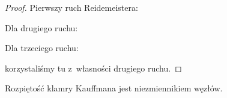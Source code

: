 \begin{proof}
Pierwszy ruch Reidemeistera:
\begin{comment}
\begin{align}
    \bracket{\MediumReidemeisterOneLeft} & \stackrel{K2}{=} A
    \bracket{\MediumReidemeisterOneSmoothA} +
    A^{-1} \bracket{\MediumReidemeisterOneSmoothB} \\ & \stackrel{K3}{=}
    A \bracket{\MediumReidemeisterOneStraight} +
    A^{-1}(-A^{-2}-A^2) \bracket{\MediumReidemeisterOneStraight} =
    -A^{-3}\bracket{\MediumReidemeisterOneStraight}
\end{align}
\end{comment}

Dla drugiego ruchu:
\begin{comment}
\begin{align}
    \bracket{\MediumKauffmanReidemeisterTwoA} & \stackrel{K2}{=}
    A \bracket{\MediumKauffmanReidemeisterTwoB} +
    A^{-1} \bracket{\MediumKauffmanReidemeisterTwoC} \\ & \stackrel{K1}{=}
    -A^{-2} \bracket{\MediumBetaSmoothing} +
    A^{-1} \bracket{\MediumKauffmanReidemeisterTwoC} \\ & \stackrel{K2}{=}
    -A^{-2} \bracket{\MediumBetaSmoothing} +
    A^{-1}A \bracket{\MediumAlphaSmoothing} +
    A^{-1}A^{-1} \bracket{\MediumBetaSmoothing} \\ & =
    \bracket{\MediumAlphaSmoothing}
\end{align}
\end{comment}

Dla trzeciego ruchu:
\begin{comment}
\begin{align}
\bracket{\MediumKauffmanReidemeisterThreeA} & \stackrel{K2}{=}
A \bracket{\MediumKauffmanReidemeisterThreeB} +
A^{-1} \bracket{\MediumKauffmanReidemeisterThreeC} \stackrel{R2}{=}
A \bracket{\MediumKauffmanReidemeisterThreeD} +
A^{-1} \bracket{\MediumKauffmanReidemeisterThreeE} \\ & \stackrel{R2}{=}
A \bracket{\MediumKauffmanReidemeisterThreeFlippedB} +
A^{-1} \bracket{\MediumKauffmanReidemeisterThreeFlippedC} \stackrel{K2}{=}
\bracket{\MediumKauffmanReidemeisterThreeFlippedA},
\end{align}
\end{comment}
korzystaliśmy tu z~własności drugiego ruchu.
\end{proof}

\begin{corollary}
    Rozpiętość klamry Kauffmana jest niezmiennikiem węzłów.
\end{corollary}


